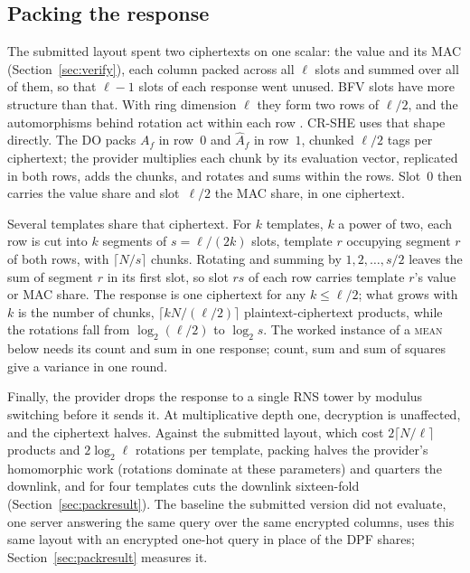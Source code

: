 \documentclass[a4paper,fleqn]{cas-dc}
\begin{document}
\subsection{Packing the response}
\label{sec:packing}
The submitted layout spent two ciphertexts on one scalar: the value and its MAC
(Section~\ref{sec:verify}), each column packed across all $\ell$ slots and
summed over all of them, so that $\ell-1$ slots of each response went unused.
BFV slots have more structure than that. With ring dimension $\ell$ they form
two rows of $\ell/2$, and the automorphisms behind rotation act within each row
\citep{halevi2014algorithms}. CR-SHE uses that shape directly. The DO packs
$A_f$ in row~$0$ and $\widehat{A}_f$ in row~$1$, chunked $\ell/2$ tags per
ciphertext; the provider multiplies each chunk by its evaluation vector,
replicated in both rows, adds the chunks, and rotates and sums within the rows.
Slot~$0$ then carries the value share and slot~$\ell/2$ the MAC share, in one
ciphertext.

Several templates share that ciphertext. For $k$ templates, $k$ a power of
two, each row is cut into $k$ segments of $s=\ell/(2k)$ slots, template $r$
occupying segment $r$ of both rows, with $\lceil N/s\rceil$ chunks. Rotating
and summing by $1,2,\dots,s/2$ leaves the sum of segment $r$ in its first slot,
so slot $rs$ of each row carries template $r$'s value or MAC share. The
response is one ciphertext for any $k\le\ell/2$; what grows with $k$ is the
number of chunks, $\lceil kN/(\ell/2)\rceil$ plaintext-ciphertext products,
while the rotations fall from $\log_2(\ell/2)$ to $\log_2 s$. The worked
instance of a \textsc{mean} below needs its count and sum in one response;
count, sum and sum of squares give a variance in one round.

Finally, the provider drops the response to a single RNS tower by modulus
switching before it sends it. At multiplicative depth one, decryption is
unaffected, and the ciphertext halves. Against the submitted layout, which
cost $2\lceil N/\ell\rceil$ products and $2\log_2\ell$ rotations per template,
packing halves the provider's homomorphic work (rotations dominate at these
parameters) and quarters the downlink, and for four templates cuts the
downlink sixteen-fold (Section~\ref{sec:packresult}). The baseline the
submitted version did not evaluate, one server answering the same query over
the same encrypted columns, uses this same layout with an encrypted one-hot
query in place of the DPF shares; Section~\ref{sec:packresult} measures it.
\end{document}
